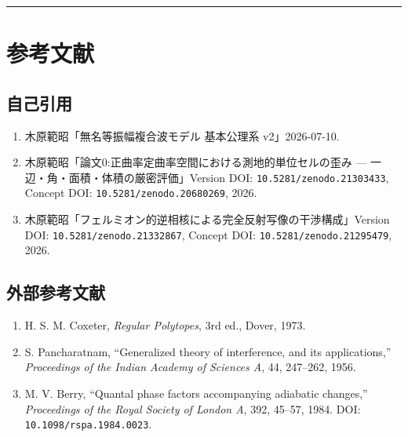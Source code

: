 \documentclass[
  a4paper,
]{article}
\providecommand{\tightlist}{%
  \setlength{\itemsep}{0pt}\setlength{\parskip}{0pt}}
\begin{document}
\begin{center}\rule{0.5\linewidth}{0.5pt}\end{center}

\section{参考文献}\label{ux53c2ux8003ux6587ux732e}

\subsection{自己引用}\label{ux81eaux5df1ux5f15ux7528}

\begin{enumerate}
\def\labelenumi{\arabic{enumi}.}
\tightlist
\item
  木原範昭「無名等振幅複合波モデル 基本公理系 v2」2026-07-10.
\item
  木原範昭「論文0:正曲率定曲率空間における測地的単位セルの歪み ---
  一辺・角・面積・体積の厳密評価」Version DOI:
  \texttt{10.5281/zenodo.21303433}, Concept DOI:
  \texttt{10.5281/zenodo.20680269}, 2026.
\item
  木原範昭「フェルミオン的逆相核による完全反射写像の干渉構成」Version
  DOI: \texttt{10.5281/zenodo.21332867}, Concept DOI:
  \texttt{10.5281/zenodo.21295479}, 2026.
\end{enumerate}

\subsection{外部参考文献}\label{ux5916ux90e8ux53c2ux8003ux6587ux732e}

\begin{enumerate}
\def\labelenumi{\arabic{enumi}.}
\setcounter{enumi}{3}
\tightlist
\item
  H. S. M. Coxeter, \emph{Regular Polytopes}, 3rd ed., Dover, 1973.
\item
  S. Pancharatnam, ``Generalized theory of interference, and its
  applications,'' \emph{Proceedings of the Indian Academy of Sciences
  A}, 44, 247--262, 1956.
\item
  M. V. Berry, ``Quantal phase factors accompanying adiabatic changes,''
  \emph{Proceedings of the Royal Society of London A}, 392, 45--57,
  1984. DOI: \texttt{10.1098/rspa.1984.0023}.
\end{enumerate}
\end{document}
